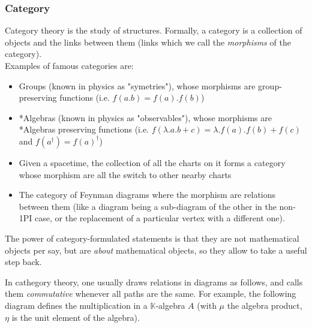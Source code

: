 \documentclass[a4paper,11pt]{article}
\numberwithin{equation}{section}
\theoremstyle{definition}
\begin{document}
        \subsubsection{Category}
    Category theory is the study of structures. Formally, a category is a collection of objects and the links between them (links which we call the \emph{morphisms} of the category).\\
    Examples of famous categories are:
    \begin{itemize}
        \item Groups (known in physics as "symetries"), whose morphisms are group-preserving functions (i.e. $f(a.b)=f(a).f(b)$)
        \item *Algebras (known in physics as "observables"), whose morphisms are *Algebras preserving functions (i.e. $f(\lambda.a.b+c)=\lambda.f(a).f(b)+f(c)$ and $f(a^\dag)=f(a)^\dag$)
        \item Given a spacetime, the collection of all the charts on it forms a category whose morphism are all the switch to other nearby charts
        \item The category of Feynman diagrams where the morphism are relations between them (like a diagram being a sub-diagram of the other in the non-1PI case, or the replacement of a particular vertex with a different one).
    \end{itemize}
    The power of category-formulated statements is that they are not mathematical objects per say, but are \emph{about} mathematical objects, so they allow to take a useful step back.
    
    In cathegory theory, one usually draws relations in diagrams as follows, and calls them \emph{commutative} whenever all paths are the same. For example, the following diagram defines the multiplication in a $\mathbb{K}$-algebra $A$ (with $\mu$ the algebra product, $\eta$ is the unit element of the algebra).\\
    
\end{document}
